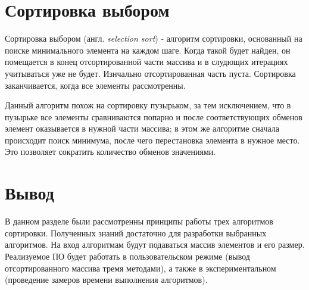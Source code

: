 \section{Сортировка выбором}

Сортировка выбором \cite{selectionSort} (англ. \textit{selection sort}) - алгоритм сортировки, основанный на поиске минимального элемента на каждом шаге. Когда такой будет найден, он помещается в конец отсортированной части массива и в слудющих итерациях учитываться уже не будет. Изнчально отсортированная часть пуста. Сортировка заканчивается, когда все элементы рассмотренны. 

Данный алгоритм похож на сортировку пузырьком, за тем исключением, что в пузырьке все элементы сравниваются попарно и после соответствующих обменов элемент оказывается в нужной части массива; в этом же алгоритме сначала происходит поиск минимума, после чего перестановка элемента в нужное место. Это позволяет сократить количество обменов значениями. 

\section{Вывод}

В данном разделе были рассмотренны принципы работы трех алгоритмов сортировки. Полученных знаний достаточно для разработки выбранных алгоритмов. На вход алгоритмам будут подаваться массив элементов и его размер. Реализуемое ПО будет работать в пользовательском режиме (вывод отсортированного массива тремя методами), а также в экспериментальном (проведение замеров времени выполнения алгоритмов).